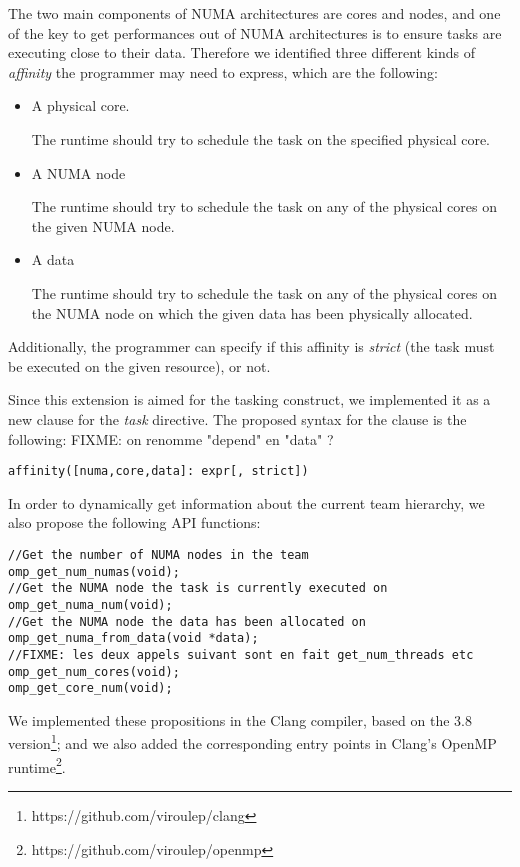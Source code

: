 \documentclass{Styles/llncs}
\begin{document}
The two main components of NUMA architectures are cores and nodes, and one of
the key to get performances out of NUMA architectures is to ensure tasks are
executing close to their data.
Therefore we identified three different kinds of \emph{affinity} the programmer
may need to express, which are the following:
\begin{itemize}
    \item A physical core.

      The runtime should try to schedule the task on the specified physical core.

    \item A NUMA node

      The runtime should try to schedule the task on any of the physical cores on
      the given NUMA node.

    \item A data

      The runtime should try to schedule the task on any of the physical cores on
      the NUMA node on which the given data has been physically allocated.
\end{itemize}

Additionally, the programmer can specify if this affinity is \emph{strict} (the task must be executed on the given resource), or not.

Since this extension is aimed for the tasking construct, we implemented it as a new
clause for the \emph{task} directive. The proposed syntax for the clause is the following:
FIXME: on renomme "depend" en "data" ?
\begin{lstlisting}
affinity([numa,core,data]: expr[, strict])
\end{lstlisting}

In order to dynamically get information about the current team hierarchy, we also propose
the following API functions:

\begin{lstlisting}
//Get the number of NUMA nodes in the team
omp_get_num_numas(void);
//Get the NUMA node the task is currently executed on
omp_get_numa_num(void);
//Get the NUMA node the data has been allocated on
omp_get_numa_from_data(void *data);
//FIXME: les deux appels suivant sont en fait get_num_threads etc
omp_get_num_cores(void);
omp_get_core_num(void);
\end{lstlisting}

We implemented these propositions in the Clang compiler, based on the 3.8 version\footnote{https://github.com/viroulep/clang}; and we also added the corresponding entry points in Clang's OpenMP runtime\footnote{https://github.com/viroulep/openmp}.
\end{document}
